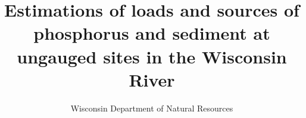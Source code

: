 \documentclass[10pt,letterpaper]{article}%
\author{Wisconsin Department of Natural Resources}
\title{Estimations of loads and sources of phosphorus and sediment at ungauged sites in the Wisconsin River}
\begin{document}
\maketitle
\pagebreak

\tableofcontents
\pagebreak

\listoffigures
\pagebreak

\listoftables
\pagebreak









\end{document}
